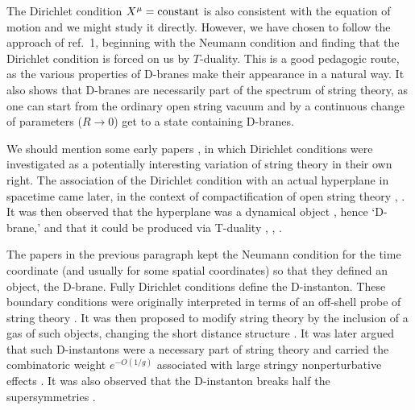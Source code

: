 \documentclass[12pt]{article}
\begin{document}
The Dirichlet condition $X^\mu= {\rm constant}$
is also consistent with the equation of motion and we might study it
directly.  However, we have chosen to follow the approach of ref.~1, beginning
with the Neumann condition and finding that the Dirichlet condition is forced
on us by
$T$-duality.  This is a good pedagogic route, as the various properties of
D-branes make their appearance in a natural way.  It also shows that D-branes
are necessarily part of the spectrum of string theory, as one can start from
the ordinary open string vacuum and by a continuous change of parameters ($R
\to 0$) get to a state containing D-branes.

We should mention some early papers \cite{early}, in which
Dirichlet conditions were investigated as a potentially interesting variation
of string theory in their own right.  The association of the Dirichlet
condition with an actual hyperplane in spacetime came later, in the context of
compactification of open string theory \cite{latera}, \cite{laterc}. It
was then observed that the hyperplane was a dynamical object \cite{dlp}, hence
`D-brane,' and that it could be produced via 
T-duality \cite{dlp}, \cite{hdual}, \cite{gdual}.

The papers in the previous paragraph kept the Neumann condition for the time
coordinate (and usually for some spatial coordinates) so that they defined
an object, the D-brane.  Fully Dirichlet conditions define the D-instanton. 
These boundary conditions were originally interpreted in terms of an off-shell
probe of string theory \cite{offshell}.  It was then proposed to modify string
theory by the inclusion of a gas of such objects, changing the short distance
structure \cite{parton}.  It was later argued \cite{joecomb} that such
D-instantons were a necessary part of string theory and carried the
combinatoric weight $e^{-O(1/g)}$ associated with large stringy
nonperturbative effects \cite{shenk1}. It was also observed that the
D-instanton breaks half the supersymmetries \cite{gdinst}. 
\end{document}
